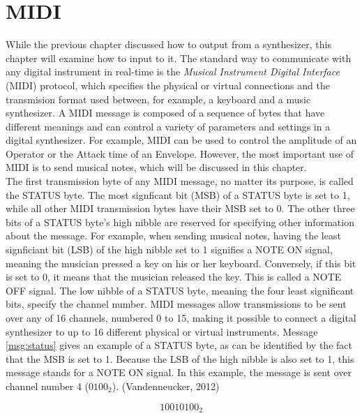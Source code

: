 \documentclass[12pt,twoside]{report}
\begin{document}
\chapter{MIDI}

While the previous chapter discussed how to output from a synthesizer, this chapter will examine how to input to it. The standard way to communicate with any digital instrument in real-time is the \emph{Musical Instrument Digital Interface} (MIDI) protocol, which specifies the physical or virtual connections and the transmision format used between, for example, a keyboard and a music synthesizer. A MIDI message is composed of a sequence of bytes that have different meanings and can control a variety of parameters and settings in a digital synthesizer. For example, MIDI can be used to control the amplitude of an Operator or the Attack time of an Envelope. However, the most important use of MIDI is to send musical notes, which will be discussed in this chapter.\\

\noindent The first transmission byte of any MIDI message, no matter its purpose, is called the STATUS byte. The most signficant bit (MSB\footnotemark{}) of a STATUS byte is set to 1, while all other MIDI transmission bytes have their MSB set to 0. The other three bits of a STATUS byte's high nibble\footnotemark{} are reserved for specifying other information about the message. For example, when sending musical notes, having the least signficiant bit (LSB) of the high nibble set to 1 signifies a NOTE ON signal, meaning the musician pressed a key on his or her keyboard. Conversely, if this bit is set to 0, it means that the musician released the key. This is called a NOTE OFF signal. The low nibble of a STATUS byte, meaning the four least significant bits, specify the channel number. MIDI messages allow transmissions to be sent over any of 16 channels, numbered 0 to 15, making it possible to connect a digital synthesizer to up to 16 different physical or virtual instruments. Message \ref{msg:status} gives an example of a STATUS byte, as can be identified by the fact that the MSB is set to 1. Because the LSB of the high nibble is also set to 1, this message stands for a NOTE ON signal. In this example, the message is sent over channel number 4 (${0100}_{2}$). (Vandenneucker, 2012)

\begin{equation}
  {10010100}_{2}
  \label{msg:status}
\end{equation}
\end{document}
